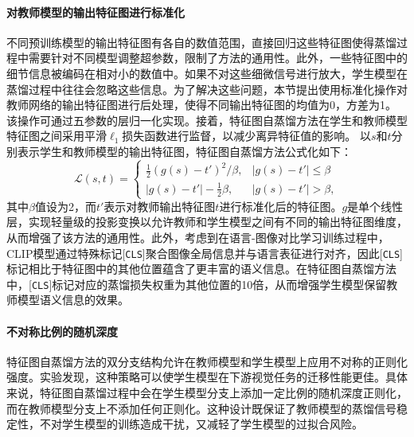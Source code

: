 \paragraph{对教师模型的输出特征图进行标准化} 不同预训练模型的输出特征图有各自的数值范围，直接回归这些特征图使得蒸馏过程中需要针对不同模型调整超参数，限制了方法的通用性。此外，一些特征图中的细节信息被编码在相对小的数值中。如果不对这些细微信号进行放大，学生模型在蒸馏过程中往往会忽略这些信息。为了解决这些问题，本节提出使用标准化操作对教师网络的输出特征图进行后处理，使得不同输出特征图的均值为0，方差为1。%
该操作可通过五参数的层归一化\cite{ba2016layer}实现。接着，特征图自蒸馏方法在学生和教师模型特征图之间采用平滑$\ell_{1}$损失函数进行监督，以减少离异特征值的影响。%
以$s$和$t$分别表示学生和教师模型的输出特征图，特征图自蒸馏方法公式化如下：
\begin{equation}
    \mathcal{L} (s, t) = \begin{cases}
        \frac{1}{2} (g(s) - t')^2/\beta, & | g(s) - t' | \leq \beta \\
        |g(s)-t'|-\frac{1}{2}\beta, & | g(s) - t' | > \beta,
    \end{cases}
    \label{eq:iclip-distill}
\end{equation}
其中$\beta$值设为2，而$t'$表示对教师输出特征图$t$进行标准化后的特征图。$g$是单个线性层，实现轻量级的投影变换以允许教师和学生模型之间有不同的输出特征图维度，从而增强了该方法的通用性。此外，考虑到在语言-图像对比学习训练过程中，CLIP模型通过特殊标记[\texttt{CLS}]聚合图像全局信息并与语言表征进行对齐，因此[\texttt{CLS}]标记相比于特征图中的其他位置蕴含了更丰富的语义信息。在特征图自蒸馏方法中，[\texttt{CLS}]标记对应的蒸馏损失权重为其他位置的10倍，从而增强学生模型保留教师模型语义信息的效果。

\paragraph{不对称比例的随机深度} 特征图自蒸馏方法的双分支结构允许在教师模型和学生模型上应用不对称的正则化强度。实验发现，这种策略可以使学生模型在下游视觉任务的迁移性能更佳。具体来说，特征图自蒸馏过程中会在学生模型分支上添加一定比例的随机深度正则化，而在教师模型分支上不添加任何正则化。这种设计既保证了教师模型的蒸馏信号稳定性，不对学生模型的训练造成干扰，又减轻了学生模型的过拟合风险。

